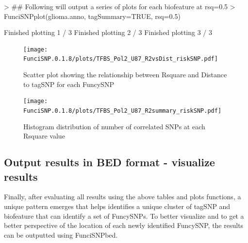 \documentclass[a4paper]{article}
\begin{document}
\begin{Schunk}
\begin{Sinput}
> ## Following will output a series of plots for each biofeature at rsq=0.5
> FunciSNPplot(glioma.anno, tagSummary=TRUE, rsq=0.5)
\end{Sinput}
\begin{Soutput}
Finished plotting  1 / 3 
Finished plotting  2 / 3 
Finished plotting  3 / 3 
\end{Soutput}
\end{Schunk}
\begin{figure}[ht!]
\begin{center}
\texttt{[image: FunciSNP.0.1.8/plots/TFBS\_Pol2\_U87\_R2vsDist\_riskSNP.pdf]}
\caption{\label{fig:TFBS_Pol2_U87_R2vsDist_riskSNP.pdf} Scatter plot 
showing the relationship between Rsquare and Distance to tagSNP for each 
FuncySNP}
{\footnotesize{}}
\end{center}
\end{figure}

\begin{figure}[ht!]
\begin{center}
\texttt{[image: FunciSNP.0.1.8/plots/TFBS\_Pol2\_U87\_R2summary\_riskSNP.pdf]}
\caption{\label{fig:TFBS_Pol2_U87_R2summary_riskSNP.pdf} Histogram 
distribution of number of correlated SNPs at each Rsquare value}
{\footnotesize{}}
\end{center}
\end{figure}

\newpage

\subsection*{Output results in BED format - visualize results}
Finally, after evaluating all results using the above tables and plots functions,
 a unique pattern emerges that helps identifies a unique cluster of tagSNP 
 and biofeature that can identify a set of FuncySNPs. To better visualize 
 and to get a better perspective of the location of each newly identified 
 FuncySNP, the results can be outputted using FunciSNPbed.
\end{document}
